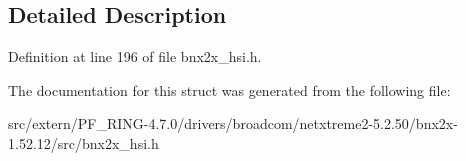 \subsection{Detailed Description}


Definition at line 196 of file bnx2x\_\-hsi.h.



The documentation for this struct was generated from the following file:\begin{DoxyCompactItemize}
\item 
src/extern/PF\_\-RING-\/4.7.0/drivers/broadcom/netxtreme2-\/5.2.50/bnx2x-\/1.52.12/src/bnx2x\_\-hsi.h\end{DoxyCompactItemize}
